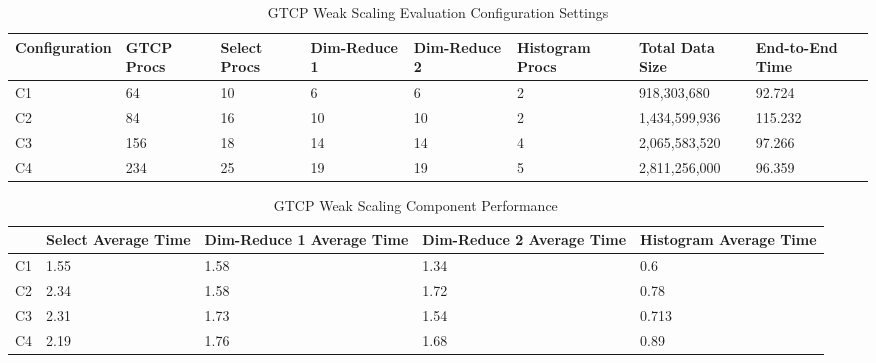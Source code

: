
\begin{table}[tbp]
\centering
\caption{GTCP Weak Scaling Evaluation Configuration Settings}
\label{tab:eval-weak-gtcp-1}
\vspace{-0.15in}
\begin{tabular}{|l|l|l|l|l|l|l|l|}
\hline
Configuration & GTCP Procs & Select Procs & Dim-Reduce 1 & Dim-Reduce 2 & Histogram Procs & Total Data Size & End-to-End Time\\
\hline
C1 & 64 & 10 & 6 & 6 & 2 & 918,303,680 & 92.724\\
\hline
C2 & 84 & 16 & 10 & 10 & 2 & 1,434,599,936 & 115.232\\
\hline
C3 & 156 & 18 & 14 & 14 & 4 & 2,065,583,520 & 97.266\\
\hline
C4 & 234 & 25 & 19 & 19 & 5 & 2,811,256,000 & 96.359\\
\hline
\end{tabular}
\vspace{-0.15in}
\end{table}

\begin{table}[tbp]
\centering
\caption{GTCP Weak Scaling Component Performance}
\label{tab:eval-weak-gtcp-2}
\vspace{-0.15in}
\begin{tabular}{|p{0.1 in}|p{0.67 in}|p{0.65 in}|p{0.65 in}|p{0.65 in}|}
\hline
 & Select Average Time & Dim-Reduce 1 Average Time & Dim-Reduce 2 Average Time & Histogram Average Time\\
\hline
C1 & 1.55 & 1.58 & 1.34 & 0.6\\
\hline
C2 & 2.34 & 1.58 & 1.72 & 0.78\\
\hline
C3 & 2.31 & 1.73 & 1.54 & 0.713\\
\hline
C4 & 2.19 & 1.76 & 1.68 & 0.89\\
\hline
\end{tabular}
\vspace{-0.25in}
\end{table}

\fi
\fi
